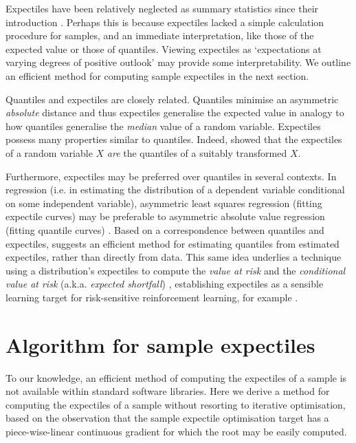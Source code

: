 \documentclass{article}
\begin{document}
Expectiles have been relatively neglected as summary statistics since their introduction \cite{waltrup2015expectile}. Perhaps this is because expectiles lacked a simple calculation procedure for samples, and an immediate interpretation, like those of the expected value or those of quantiles.
Viewing expectiles as `expectations at varying degrees of positive outlook'  may provide some interpretability.
We outline an efficient method for computing sample expectiles in the next section.

Quantiles and expectiles are closely related.
Quantiles minimise an asymmetric \emph{absolute} distance and thus expectiles generalise the expected value in analogy to how quantiles generalise the \emph{median} value of a random variable. 
Expectiles possess many properties similar to quantiles.
Indeed, \cite{jones1994expectiles} showed that the expectiles of a random variable $X$ \emph{are} the quantiles of a suitably transformed $X$.

Furthermore, expectiles may be preferred over quantiles in several contexts.
In regression (i.e. in estimating the distribution of a dependent variable conditional on some independent variable), asymmetric least squares regression (fitting expectile curves) may be preferable to asymmetric absolute value regression (fitting quantile curves) \cite{kneib2013beyond}. 
Based on a correspondence between quantiles and expectiles, \cite{efron1991regression} suggests an efficient method for estimating quantiles from estimated expectiles, rather than directly from data.
This same idea underlies a technique using a distribution's expectiles to compute the \emph{value at risk} and the \emph{conditional value at risk} (a.k.a. \emph{expected shortfall}) \cite{taylor2008estimating}, establishing expectiles as a sensible learning target for risk-sensitive reinforcement learning, for example \cite{morimura2012parametric}.


\section{Algorithm for sample expectiles}

To our knowledge, an efficient method of computing the expectiles of a
sample is not available within standard software libraries.  Here we derive
a method for computing the expectiles of a sample without resorting to
iterative optimisation, based on the observation that the sample expectile
optimisation target has a piece-wise-linear continuous gradient for which
the root may be easily computed.
\end{document}

